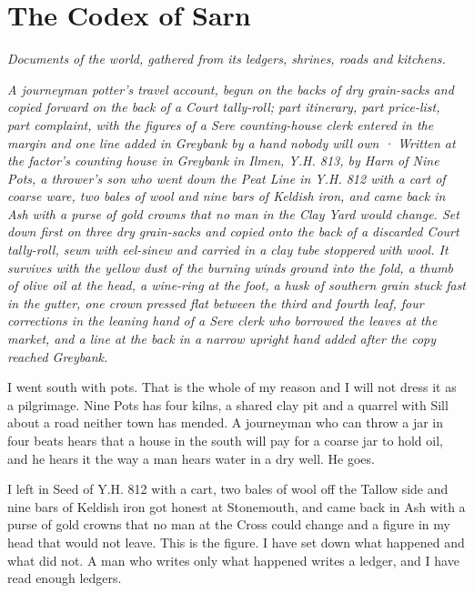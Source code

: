 \documentclass{design/chronicle}
\begin{document}
\chapter*{The Codex of Sarn}
{\centering\FellFont\itshape\small\color{faded} Documents of the world, gathered from its ledgers, shrines, roads and kitchens.\par}\bigskip
\clearpage{}
{\centering\FellFont\itshape\footnotesize\color{faded} A journeyman potter’s travel account, begun on the backs of dry grain-sacks and copied forward on the back of a Court tally-roll; part itinerary, part price-list, part complaint, with the figures of a Sere counting-house clerk entered in the margin and one line added in Greybank by a hand nobody will own · Written at the factor’s counting house in Greybank in Ilmen, Y.H. 813, by Harn of Nine Pots, a thrower’s son who went down the Peat Line in Y.H. 812 with a cart of coarse ware, two bales of wool and nine bars of Keldish iron, and came back in Ash with a purse of gold crowns that no man in the Clay Yard would change. Set down first on three dry grain-sacks and copied onto the back of a discarded Court tally-roll, sewn with eel-sinew and carried in a clay tube stoppered with wool. It survives with the yellow dust of the burning winds ground into the fold, a thumb of olive oil at the head, a wine-ring at the foot, a husk of southern grain stuck fast in the gutter, one crown pressed flat between the third and fourth leaf, four corrections in the leaning hand of a Sere clerk who borrowed the leaves at the market, and a line at the back in a narrow upright hand added after the copy reached Greybank.\par}\medskip
I went south with pots. That is the whole of my reason and I will not dress it as a pilgrimage. Nine Pots has four kilns, a shared clay pit and a quarrel with Sill about a road neither town has mended. A journeyman who can throw a jar in four beats hears that a house in the south will pay for a coarse jar to hold oil, and he hears it the way a man hears water in a dry well. He goes.

I left in Seed of Y.H. 812 with a cart, two bales of wool off the Tallow side and nine bars of Keldish iron got honest at Stonemouth, and came back in Ash with a purse of gold crowns that no man at the Cross could change and a figure in my head that would not leave. This is the figure. I have set down what happened and what did not. A man who writes only what happened writes a ledger, and I have read enough ledgers.
\end{document}
